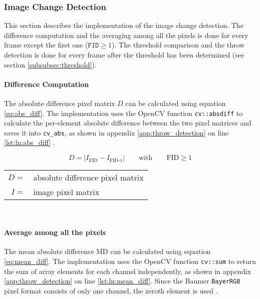 \subsubsection{Image Change Detection}
\label{subsubsec:image_change_detection}

This section describes the implementation of the image change detection.
The difference computation and the averaging among all the pixels is done for every frame except the first one ($\texttt{FID} \geq 1$).
The threshold comparison and the throw detection is done for every frame after the threshold has been determined (see section \ref{subsubsec:threshold}).

\paragraph{Difference Computation}
The absolute difference pixel matrix $D$ can be calculated using equation \ref{eq:abs_diff}.
The implementation uses the OpenCV function \texttt{cv::absdiff} to calculate the per-element absolute difference between the two pixel matrices and saves it into \texttt{cv\_abs}, as shown in appendix \ref{app:throw_detection} on line \ref{lst:ln:abs_diff} \cite{opencv_ooa_absdiff}.

\begin{equation}
  D = |I_\text{FID} - I_\text{FID-1}| \quad\quad \text{with} \quad\quad \text{FID} \geq 1
  \label{eq:abs_diff}
\end{equation}

\begin{tabular}{rl}
  $D =$ & absolute difference pixel matrix \\
  $I =$ & image pixel matrix \\
\end{tabular}
\\

\paragraph{Average among all the pixels}
The mean absolute difference $\overline{\text{MD}}$ can be calculated using equation \ref{eq:mean_diff}.
The implementation uses the OpenCV function \texttt{cv::sum} to return the sum of array elements for each channel independently, as shown in appendix \ref{app:throw_detection} on line \ref{lst:ln:mean_diff}.
Since the Baumer \texttt{BayerRG8} pixel format consists of only one channel, the zeroth element is used \cite{opencv_ooa_sum}.

